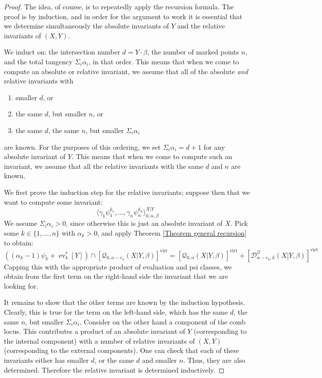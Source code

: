 \documentclass[10pt]{amsart}
\newcommand{\Q}[4]{\mathcal{Q}_{#1,#2}(#3,#4)}
\newcommand{\virt}[1]{[#1]^{\operatorname{virt}}}
\newcommand{\ev}{\operatorname{ev}}
\theoremstyle{definition}
\theoremstyle{definition}
\begin{document}
\begin{proof} The idea, of course, is to repeatedly apply the recursion formula. The proof is by induction, and in order for the argument to work it is essential that we determine simultaneously  the absolute invariants of $Y$ and the relative invariants of $(X,Y)$.

We induct on: the intersection number $d=Y\cdot\beta$, the number of marked points $n$, and the total tangency $\Sigma_i \alpha_i$, in that order. This means that when we come to compute an absolute or relative invariant, we assume that all of the absolute \emph{and} relative invariants with
\begin{enumerate}
\item smaller $d$, or
\item the same $d$, but smaller $n$, or
\item the same $d$, the same $n$, but smaller $\Sigma_i \alpha_i$
\end{enumerate}
are known. For the purposes of this ordering, we set $\Sigma_i \alpha_i = d+1$ for any absolute invariant of $Y$. This means that when we come to compute such an invariant, we assume that all the relative invariants with the same $d$ and $n$ are known.

We first prove the induction step for the relative invariants; suppose then that we want to compute some invariant:
\begin{equation*} \langle \gamma_1 \psi_1^{k_1}, \ldots, \gamma_n \psi_n^{k_n} \rangle_{0,\alpha,\beta}^{X|Y}  \end{equation*}
We assume $\Sigma_i \alpha_i > 0$, since otherwise this is just an absolute invariant of $X$. Pick some $k \in \{1,\ldots,n\}$ with $\alpha_k > 0$, and apply Theorem \ref{Theorem general recursion} to obtain:
\begin{equation*} ((\alpha_k-1) \psi_k + \ev_k^* [Y]) \cap \virt{\Q{0}{\alpha-e_k}{X|Y}{\beta}} = \virt{\Q{0}{\alpha}{X|Y}{\beta}} + \virt{\mathcal D^\mathcal{Q}_{\alpha-e_k,k}(X|Y,\beta)} \end{equation*}
Capping this with the appropriate product of evaluation and psi classes, we obtain from the first term on the right-hand side the invariant that we are looking for.

It remains to show that the other terms are known by the induction hypothesis. Clearly, this is true for the term on the left-hand side, which has the same $d$, the same $n$, but smaller $\Sigma_i \alpha_i$. Consider on the other hand a component of the comb locus. This contributes a product of an absolute invariant of $Y$ (corresponding to the internal component) with a number of relative invariants of $(X,Y)$ (corresponding to the external components). One can check that each of these invariants either has smaller $d$, or the same $d$ and smaller $n$. Thus, they are also determined. Therefore the relative invariant is determined inductively.


\end{proof}
\end{document}
